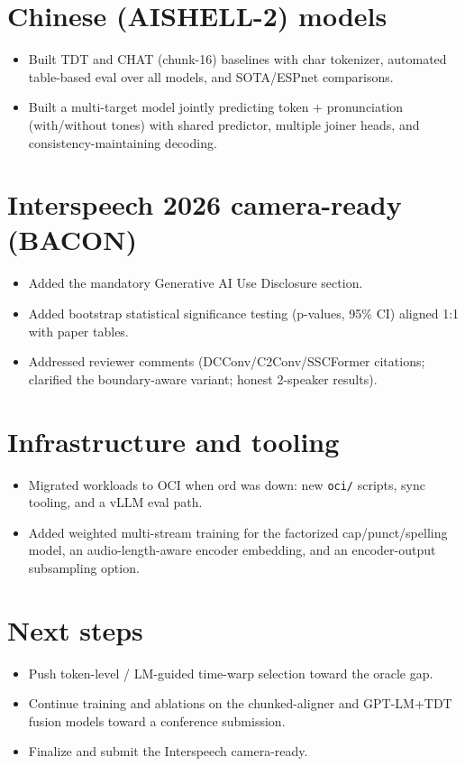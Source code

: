 \documentclass[11pt]{article}
\begin{document}
\section{Chinese (AISHELL-2) models}
\begin{itemize}
  \item Built TDT and CHAT (chunk-16) baselines with char tokenizer, automated table-based eval over all models, and SOTA/ESPnet comparisons.
  \item Built a multi-target model jointly predicting token + pronunciation (with/without tones) with shared predictor, multiple joiner heads, and consistency-maintaining decoding.
\end{itemize}

\section{Interspeech 2026 camera-ready (BACON)}
\begin{itemize}
  \item Added the mandatory Generative AI Use Disclosure section.
  \item Added bootstrap statistical significance testing (p-values, 95\% CI) aligned 1:1 with paper tables.
  \item Addressed reviewer comments (DCConv/C2Conv/SSCFormer citations; clarified the boundary-aware variant; honest 2-speaker results).
\end{itemize}

\section{Infrastructure and tooling}
\begin{itemize}
  \item Migrated workloads to OCI when ord was down: new \texttt{oci/} scripts, sync tooling, and a vLLM eval path.
  \item Added weighted multi-stream training for the factorized cap/punct/spelling model, an audio-length-aware encoder embedding, and an encoder-output subsampling option.
\end{itemize}

\section{Next steps}
\begin{itemize}
  \item Push token-level / LM-guided time-warp selection toward the oracle gap.
  \item Continue training and ablations on the chunked-aligner and GPT-LM+TDT fusion models toward a conference submission.
  \item Finalize and submit the Interspeech camera-ready.
\end{itemize}
\end{document}
